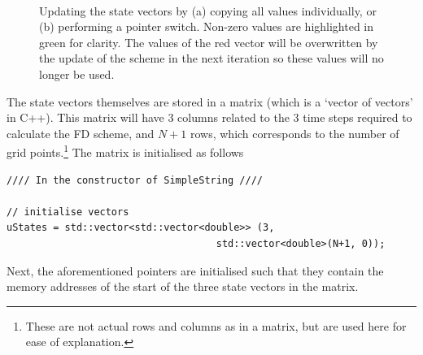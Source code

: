 \begin{figure}[t]
    \centering
    \\
    \caption{Updating the state vectors by (a) copying all values individually, or (b) performing a pointer switch. Non-zero values are highlighted in green for clarity. The values of the red vector will be overwritten by the update of the scheme in the next iteration so these values will no longer be used.\label{fig:pointerSwitchFull}}
\end{figure}

The state vectors themselves are stored in a matrix (which is a `vector of vectors' in C++). This matrix will have 3 columns related to the 3 time steps required to calculate the FD scheme, and $N+1$ rows, which corresponds to the number of grid points.\footnote{These are not actual rows and columns as in a matrix, but are used here for ease of explanation.} The matrix is initialised as follows

\setlstCpp
\begin{lstlisting}[belowskip=-0.5\baselineskip]
//// In the constructor of SimpleString ////

// initialise vectors
uStates = std::vector<std::vector<double>> (3, 
                                    std::vector<double>(N+1, 0));
\end{lstlisting}
%
Next, the aforementioned pointers are initialised such that they contain the memory addresses of the start of the three state vectors in the matrix.

